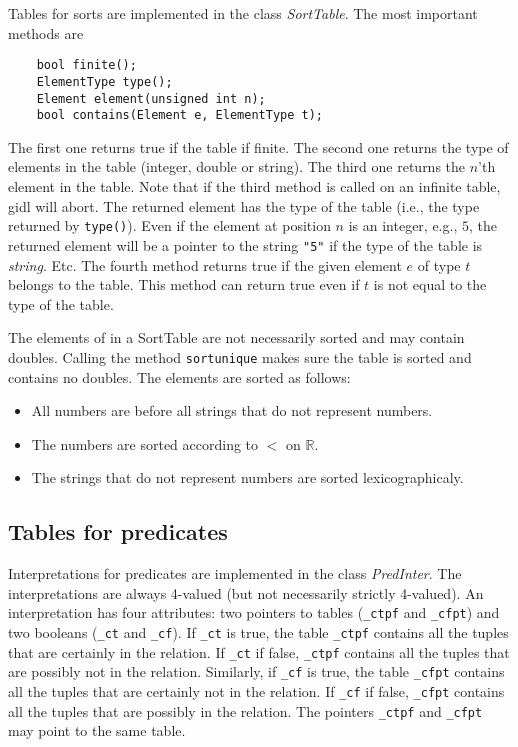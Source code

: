 \documentclass{article}
\newcommand{\gidl}{{\sc gidl}\xspace}
\begin{document}
Tables for sorts are implemented in the class \emph{SortTable}. The most important methods are 
\begin{lstlisting}
	bool finite();
	ElementType type();
	Element element(unsigned int n);
	bool contains(Element e, ElementType t);
\end{lstlisting}
The first one returns true if the table if finite. The second one returns the type of elements in the table (integer, double or string). The third one returns the $n$'th element in the table. Note that if the third method is called on an infinite table, \gidl will abort. The returned element has the type of the table (i.e., the type returned by \texttt{type()}). Even if the element at position $n$ is an integer, e.g., $5$, the returned element will be a pointer to the string \texttt{"5"} if the type of the table is \emph{string}. Etc. The fourth method returns true if the given element $e$ of type $t$ belongs to the table. This method can return true even if $t$ is not equal to the type of the table.

The elements of in a SortTable are not necessarily sorted and may contain doubles. Calling the method \texttt{sortunique} makes sure the table is sorted and contains no doubles. The elements are sorted as follows:
\begin{itemize}
	\item All numbers are before all strings that do not represent numbers.
	\item The numbers are sorted according to $<$ on $\mathbb{R}$.
	\item The strings that do not represent numbers are sorted lexicographicaly.
\end{itemize}

\subsection*{Tables for predicates}

Interpretations for predicates are implemented in the class \emph{PredInter}. The interpretations are always 4-valued (but not necessarily strictly 4-valued). An interpretation has four attributes: two pointers to tables (\texttt{\_ctpf} and \texttt{\_cfpt}) and two booleans (\texttt{\_ct} and \texttt{\_cf}). If \texttt{\_ct} is true, the table \texttt{\_ctpf} contains all the tuples that are certainly in the relation. If \texttt{\_ct} if false, \texttt{\_ctpf} contains all the tuples that are possibly not in the relation. Similarly, if \texttt{\_cf} is true, the table \texttt{\_cfpt} contains all the tuples that are certainly not in the relation. If \texttt{\_cf} if false, \texttt{\_cfpt} contains all the tuples that are possibly in the relation. The pointers \texttt{\_ctpf} and \texttt{\_cfpt} may point to the same table.
\end{document}
